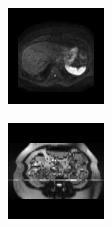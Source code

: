 \begin{figure}[htb]
        \begin{subfigure}[b]{0.25\textwidth}
                \centering
                \includegraphics[width=.95\linewidth]{img_hyperopt/Abdomen_785}
        \end{subfigure}%
        \begin{subfigure}[b]{0.25\textwidth}
                \centering
                \includegraphics[width=.95\linewidth]{img_hyperopt/Abdomen_1050}

\end{subfigure}
\end{figure}
